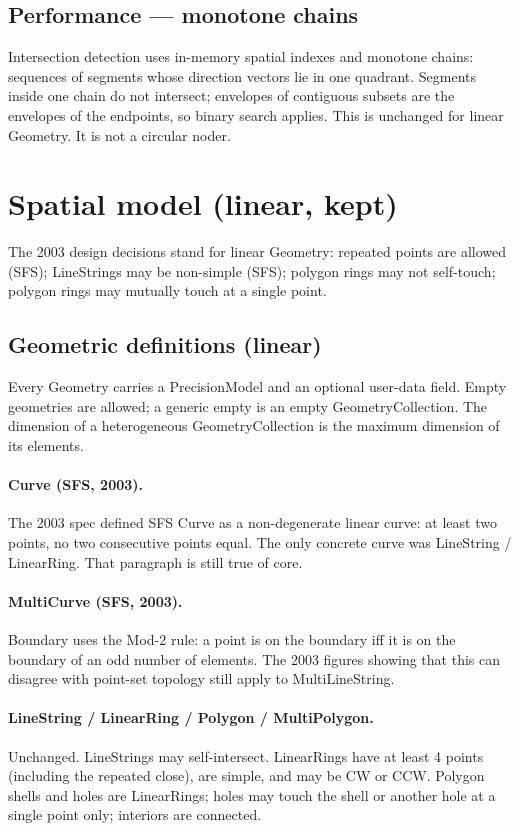 \documentclass[11pt]{article}
\begin{document}
\subsection{Performance --- monotone chains}
Intersection detection uses in-memory spatial indexes and monotone
chains: sequences of segments whose direction vectors lie in one
quadrant. Segments inside one chain do not intersect; envelopes of
contiguous subsets are the envelopes of the endpoints, so binary
search applies. This is unchanged for linear Geometry. It is not a
circular noder.

\section{Spatial model (linear, kept)}
The 2003 design decisions stand for linear Geometry: repeated points
are allowed (SFS); LineStrings may be non-simple (SFS); polygon rings
may not self-touch; polygon rings may mutually touch at a single
point.

\subsection{Geometric definitions (linear)}
Every Geometry carries a PrecisionModel and an optional user-data
field. Empty geometries are allowed; a generic empty is an empty
GeometryCollection. The dimension of a heterogeneous
GeometryCollection is the maximum dimension of its elements.

\paragraph{Curve (SFS, 2003).}
The 2003 spec defined SFS Curve as a non-degenerate linear curve: at
least two points, no two consecutive points equal. The only concrete
curve was LineString / LinearRing. That paragraph is still true of
core.

\paragraph{MultiCurve (SFS, 2003).}
Boundary uses the Mod-2 rule: a point is on the boundary iff it is
on the boundary of an odd number of elements. The 2003 figures
showing that this can disagree with point-set topology still apply
to MultiLineString.

\paragraph{LineString / LinearRing / Polygon / MultiPolygon.}
Unchanged. LineStrings may self-intersect. LinearRings have at least
4 points (including the repeated close), are simple, and may be CW
or CCW. Polygon shells and holes are LinearRings; holes may touch
the shell or another hole at a single point only; interiors are
connected.
\end{document}
